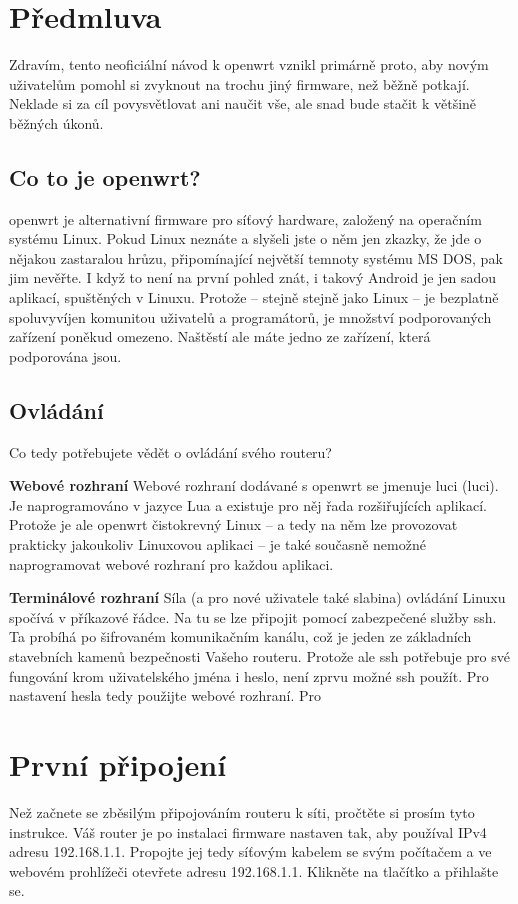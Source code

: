 \section{Předmluva}
Zdravím, tento neoficiální návod k \gls{openwrt} vznikl primárně proto,
aby novým uživatelům pomohl si zvyknout na trochu jiný firmware, než běžně
potkají. Neklade si za cíl povysvětlovat ani naučit vše, ale snad bude
stačit k většině běžných úkonů.

\subsection{Co to je \gls{openwrt}?}
\gls{openwrt} je alternativní firmware pro síťový hardware, založený na
operačním systému Linux. Pokud Linux neznáte a slyšeli jste o něm jen
zkazky, že jde o nějakou zastaralou hrůzu, připomínající největší temnoty
systému MS DOS, pak jim nevěřte. I když to není na první pohled znát, i
takový Android je jen sadou aplikací, spuštěných v Linuxu. Protože -- stejně
stejně jako Linux -- je bezplatně spoluvyvíjen komunitou uživatelů a programátorů,
je množství podporovaných zařízení poněkud omezeno. Naštěstí ale máte jedno
ze zařízení, která podporována jsou.

\subsection{Ovládání}
Co tedy potřebujete vědět o ovládání svého routeru?
\begin{description}
\item{\textbf{Webové rozhraní}}
Webové rozhraní dodávané s \gls{openwrt} se jmenuje \acrshort{luci}
(\acrlong{luci}). Je naprogramováno v jazyce Lua a existuje pro něj řada
rozšiřujících aplikací. Protože je ale \gls{openwrt} čistokrevný Linux
-- a tedy na něm lze provozovat prakticky jakoukoliv Linuxovou aplikaci --
je také současně nemožné naprogramovat webové rozhraní pro každou aplikaci.
\item{\textbf{Terminálové rozhraní}}
Síla (a pro nové uživatele také slabina) ovládání Linuxu spočívá v příkazové
řádce. Na tu se lze připojit pomocí zabezpečené služby \gls{ssh}. Ta probíhá
po šifrovaném komunikačním kanálu, což je jeden ze základních stavebních
kamenů bezpečnosti Vašeho routeru. Protože ale ssh potřebuje pro své fungování
krom uživatelského jména i heslo, není zprvu možné ssh použít. Pro nastavení
hesla tedy použijte webové rozhraní. Pro
\end{description}

\section{První připojení}
Než začnete se zběsilým připojováním routeru k síti, pročtěte si prosím tyto
instrukce. Váš router je po instalaci firmware nastaven tak, aby používal IPv4 adresu
192.168.1.1. Propojte jej tedy síťovým kabelem se svým počítačem a ve webovém
prohlížeči otevřete adresu 192.168.1.1. Klikněte na tlačítko  a
přihlašte se.

